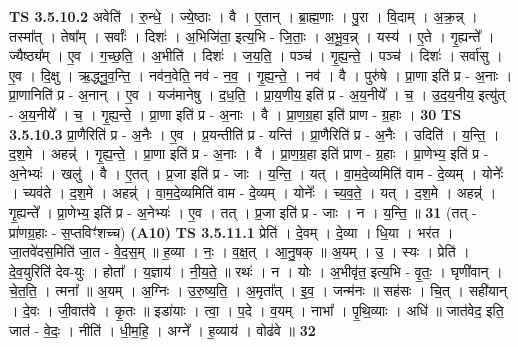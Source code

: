 \documentclass[17pt]{extarticle}
\begin{document}
                  \newline
                                \textbf{ TS 3.5.10.2} \newline
                  अवेति॑ । रु॒न्धे॒ । ज्ये॒ष्ठाः । वै । ए॒तान् । ब्रा॒ह्म॒णाः । पु॒रा । वि॒दाम् । अ॒क्र॒न्न् । तस्मा᳚त् । तेषा᳚म् । सर्वाः᳚ । दिशः॑ । अ॒भिजि॑ता॒ इत्य॒भि - जि॒ताः॒ । अ॒भू॒व॒न्न् । यस्य॑ । ए॒ते । गृ॒ह्यन्ते᳚ । ज्यैष्ठ्य᳚म् । ए॒व । ग॒च्छ॒ति॒ । अ॒भीति॑ । दिशः॑ । ज॒य॒ति॒ । पञ्च॑ । गृ॒ह्य॒न्ते॒ । पञ्च॑ । दिशः॑ । सर्वा॑सु । ए॒व । दि॒क्षु । ऋ॒द्ध्नु॒व॒न्ति॒ । नव॑न॒वेति॒ नव॑ - न॒व॒ । गृ॒ह्य॒न्ते॒ । नव॑ । वै । पुरु॑षे । प्रा॒णा इति॑ प्र - अ॒नाः । प्रा॒णानिति॑ प्र - अ॒नान् । ए॒व । यज॑मानेषु । द॒ध॒ति॒ । प्रा॒य॒णीय॒ इति॑ प्र - अ॒य॒नीये᳚ । च॒ । उ॒द॒य॒नीय॒ इत्यु॑त् - अ॒य॒नीये᳚ । च॒ । गृ॒ह्य॒न्ते॒ । प्रा॒णा इति॑ प्र - अ॒नाः । वै । प्रा॒ण॒ग्र॒हा इति॑ प्राण - ग्र॒हाः । \textbf{  30} \newline
                  \newline
                                \textbf{ TS 3.5.10.3} \newline
                  प्रा॒णैरिति॑ प्र - अ॒नैः । ए॒व । प्र॒यन्तीति॑ प्र - यन्ति॑ । प्रा॒णैरिति॑ प्र - अ॒नैः । उदिति॑ । य॒न्ति॒ । द॒श॒मे । अहन्न्॑ । गृ॒ह्य॒न्ते॒ । प्रा॒णा इति॑ प्र - अ॒नाः । वै । प्रा॒ण॒ग्र॒हा इति॑ प्राण - ग्र॒हाः । प्रा॒णेभ्य॒ इति॑ प्र - अ॒नेभ्यः॑ । खलु॑ । वै । ए॒तत् । प्र॒जा इति॑ प्र - जाः । य॒न्ति॒ । यत् । वा॒म॒दे॒व्यमिति॑ वाम - दे॒व्यम् । योनेः᳚ । च्यव॑ते । द॒श॒मे । अहन्न्॑ । वा॒म॒दे॒व्यमिति॑ वाम - दे॒व्यम् । योनेः᳚ । च्य॒व॒ते॒ । यत् । द॒श॒मे । अहन्न्॑ । गृ॒ह्यन्ते᳚ । प्रा॒णेभ्य॒ इति॑ प्र - अ॒नेभ्यः॑ । ए॒व । तत् । प्र॒जा इति॑ प्र - जाः । न । य॒न्ति॒ ॥ \textbf{  31} \newline
                  \newline
                      (तत् - प्रा॑णग्र॒हाः - स॒प्तविꣳ॑शच्च)  \textbf{(A10)} \newline \newline
                                \textbf{ TS 3.5.11.1} \newline
                  प्रेति॑ । दे॒वम् । दे॒व्या । धि॒या । भर॑त । जा॒तवे॑दस॒मिति॑ जा॒त - वे॒द॒स॒म् ॥ ह॒व्या । नः॒ । व॒क्ष॒त् । आ॒नु॒षक् ॥ अ॒यम् । उ॒ । स्यः । प्रेति॑ । दे॒व॒युरिति॑ देव-युः । होता᳚ । य॒ज्ञाय॑ । नी॒य॒ते॒ ॥ रथः॑ । न । योः । अ॒भीवृ॑त॒ इत्य॒भि - वृ॒तः॒ । घृणी॑वान् । चे॒त॒ति॒ । त्मना᳚ ॥ अ॒यम् । अ॒ग्निः । उ॒रु॒ष्य॒ति॒ । अ॒मृता᳚त् । इ॒व॒ । जन्म॑नः ॥ सह॑सः । चि॒त् । सही॑यान् । दे॒वः । जी॒वात॑वे । कृ॒तः ॥ इडा॑याः । त्वा॒ । प॒दे । व॒यम् । नाभा᳚ । पृ॒थि॒व्याः । अधि॑ ॥ जात॑वेद॒ इति॒ जात॑ - वे॒दः॒ । नीति॑ । धी॒म॒हि॒ । अग्ने᳚ । ह॒व्याय॑ । वोढ॑वे ॥ \textbf{  32} \newline
\end{document}

